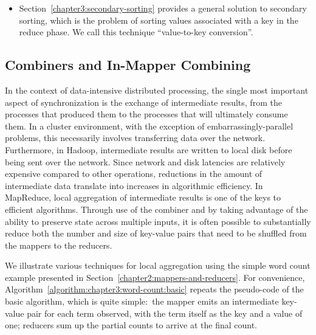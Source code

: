 \documentclass[11pt]{article}
\begin{document}
\begin{itemize}
\item Section~\ref{chapter3:secondary-sorting} provides a general
  solution to secondary sorting, which is the problem of sorting
  values associated with a key in the reduce phase.  We call this
  technique ``value-to-key conversion''.


\end{itemize}

\subsection{Combiners and In-Mapper Combining}
\label{chapter3:local-aggregation}

In the context of data-intensive distributed processing, the single
most important aspect of synchronization is the exchange of
intermediate results, from the processes that produced them to the
processes that will ultimately consume them.  In a cluster
environment, with the exception of embarrassingly-parallel problems,
this necessarily involves transferring data over the network.
Furthermore, in Hadoop, intermediate results are written to local disk
before being sent over the network.  Since network and disk latencies
are relatively expensive compared to other operations, reductions in
the amount of intermediate data translate into increases in
algorithmic efficiency.  In MapReduce, local aggregation of
intermediate results is one of the keys to efficient algorithms.
Through use of the combiner and by taking advantage of the ability to
preserve state across multiple inputs, it is often possible to
substantially reduce both the number and size of key-value pairs that
need to be shuffled from the mappers to the reducers.

We illustrate various techniques for local aggregation using the
simple word count example presented in
Section~\ref{chapter2:mappers-and-reducers}.  For convenience,
Algorithm~\ref{algorithm:chapter3:word-count:basic} repeats the pseudo-code
of the basic algorithm, which is quite simple:\ the mapper emits an
intermediate key-value pair for each term observed, with the term
itself as the key and a value of one; reducers sum up the partial
counts to arrive at the final count.
\end{document}
